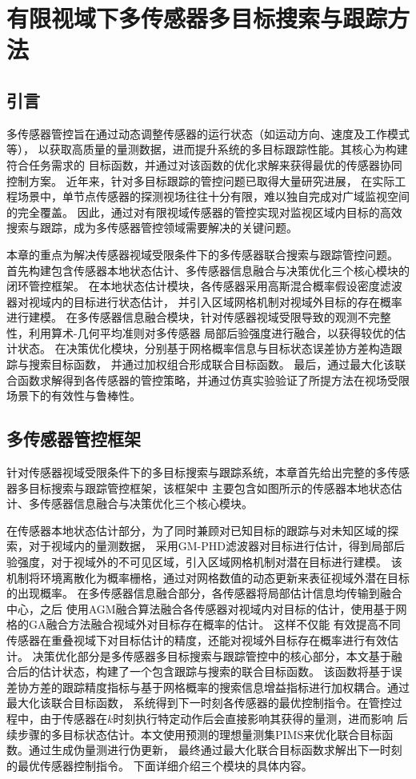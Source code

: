 \chapter{有限视域下多传感器多目标搜索与跟踪方法}

\section{引言}
多传感器管控旨在通过动态调整传感器的运行状态（如运动方向、速度及工作模式等），
以获取高质量的量测数据，进而提升系统的多目标跟踪性能。其核心为构建符合任务需求的
目标函数，并通过对该函数的优化求解来获得最优的传感器协同控制方案。
近年来，针对多目标跟踪的管控问题已取得大量研究进展，
在实际工程场景中，单节点传感器的探测视场往往十分有限，难以独自完成对广域监视空间的完全覆盖。
因此，通过对有限视域传感器的管控实现对监视区域内目标的高效搜索与跟踪，成为多传感器管控领域需要解决的关键问题。

本章的重点为解决传感器视域受限条件下的多传感器联合搜索与跟踪管控问题。
首先构建包含传感器本地状态估计、多传感器信息融合与决策优化三个核心模块的闭环管控框架。 
在本地状态估计模块，各传感器采用高斯混合概率假设密度滤波器对视域内的目标进行状态估计，
并引入区域网格机制对视域外目标的存在概率进行建模。 
在多传感器信息融合模块，针对传感器视域受限导致的观测不完整性，利用算术-几何平均准则对多传感器
局部后验强度进行融合，以获得较优的估计状态。
在决策优化模块，分别基于网格概率信息与目标状态误差协方差构造跟踪与搜索目标函数，
并通过加权组合形成联合目标函数。
最后，通过最大化该联合函数求解得到各传感器的管控策略，并通过仿真实验验证了所提方法在视场受限场景下的有效性与鲁棒性。

\section{多传感器管控框架}
针对传感器视域受限条件下的多目标搜索与跟踪系统，本章首先给出完整的多传感器多目标搜索与跟踪管控框架，该框架中
主要包含如图所示的传感器本地状态估计、多传感器信息融合与决策优化三个核心模块。






在传感器本地状态估计部分，为了同时兼顾对已知目标的跟踪与对未知区域的探索，对于视域内的量测数据，
采用GM-PHD滤波器对目标进行估计，得到局部后验强度，对于视域外的不可见区域，引入区域网格机制对潜在目标进行建模。
该机制将环境离散化为概率栅格，通过对网格数值的动态更新来表征视域外潜在目标的出现概率。
在多传感器信息融合部分，各传感器将局部估计信息均传输到融合中心，之后
使用AGM融合算法融合各传感器对视域内对目标的估计，使用基于网格的GA融合方法融合视域外对目标存在概率的估计。
这样不仅能
有效提高不同传感器在重叠视域下对目标估计的精度，还能对视域外目标存在概率进行有效估计。
决策优化部分是多传感器多目标搜索与跟踪管控中的核心部分，本文基于融合后的估计状态，构建了一个包含跟踪与搜索的联合目标函数。 
该函数将基于误差协方差的跟踪精度指标与基于网格概率的搜索信息增益指标进行加权耦合。通过最大化该联合目标函数，
系统得到下一时刻各传感器的最优控制指令。在管控过程中，由于传感器在$k$时刻执行特定动作后会直接影响其获得的量测，进而影响
后续步骤的多目标状态估计。本文使用预测的理想量测集PIMS来优化联合目标函数。通过生成伪量测进行伪更新，
最终通过最大化联合目标函数求解出下一时刻的最优传感器控制指令。
下面详细介绍三个模块的具体内容。


